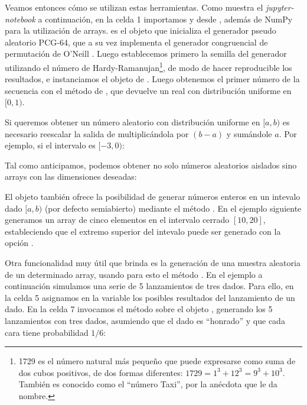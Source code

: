 Veamos entonces cómo se utilizan estas herramientas. Como muestra el \textit{jupyter-notebook} a continuación, en la celda 1 importamos  y  desde , además de NumPy para la utilización de arrays.  es el objeto  que inicializa el generador pseudo aleatorio PCG-64, que a su vez implementa el generador congruencial de permutación de O'Neill \cite{oneill2014}. Luego establecemos primero la semilla del generador utilizando el número de Hardy-Ramanujan\footnote{1729 es el número natural más pequeño que puede expresarse como suma de dos cubos positivos, de dos formas diferentes: $1729 = 1^3 + 12^3 = 9^3 + 10^3$. También es conocido como el ``número Taxi'', por la anécdota que le da nombre.}, de modo de hacer reproducible los resultados, e instanciamos el objeto  de . Luego obtenemos el primer número de la secuencia con el método  de , que devuelve un real con distribución uniforme en $[0, 1)$.


Si queremos obtener un número aleatorio con distribución uniforme en $[a, b)$ es necesario reescalar la salida de  multiplicándola por $(b - a)$ y sumándole $a$. Por ejemplo, si el intervalo es $[-3,  0)$:


Tal como anticipamos, podemos obtener no solo números aleatorios aislados sino arrays con las dimensiones deseadas:



El objeto  también ofrece la posibilidad de generar números enteros en un intevalo dado $[a, b)$ (por defecto semiabierto) mediante el método . En el ejemplo siguiente generamos un array de cinco elementos en el intervalo  cerrado $[10, 20]$, estableciendo que el extremo superior del intevalo puede ser generado con la opción .


Otra funcionalidad muy útil que brinda  es la generación de una muestra aleatoria de un determinado array, usando para esto el método . En el ejemplo a continuación simulamos una serie de 5 lanzamientos de tres dados. Para ello, en la celda 5 asignamos en la variable  los posibles resultados del lanzamiento de un dado. En la celda 7 invocamos el método  sobre el objeto , generando los 5 lanzamientos con tres dados, asumiendo que el dado es ``honrado'' y que cada cara tiene probabilidad $1/6$:

